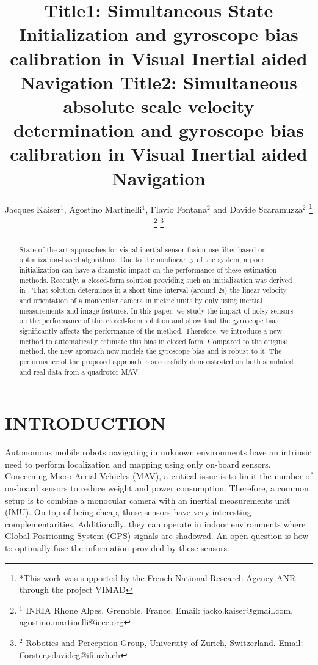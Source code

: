 \documentclass[letterpaper, 10 pt, conference]{ieeeconf}  %
\title{\LARGE \bf
Title1: Simultaneous State Initialization and gyroscope bias calibration in Visual Inertial aided Navigation
Title2: Simultaneous absolute scale velocity determination and gyroscope bias calibration in Visual Inertial aided Navigation
}
\author{Jacques Kaiser$^{1}$, Agostino Martinelli$^{1}$, Flavio Fontana$^{2}$ and Davide Scaramuzza$^{2}$%
 \thanks{*This work was supported by the French National Research
Agency ANR through the project VIMAD}%
 \thanks{$^{1}$ INRIA Rhone Alpes, Grenoble, France. Email: jacko.kaiser@gmail.com, agostino.martinelli@ieee.org}%
 \thanks{$^{2}$ Robotics and Perception Group, University of Zurich, Switzerland. Email: fforster,sdavideg@ifi.uzh.ch}%
}
\begin{document}
\maketitle
\thispagestyle{empty}
\pagestyle{empty}



\begin{abstract}
State of the art approaches for visual-inertial sensor fusion use filter-based or optimization-based algorithms. Due to the nonlinearity of the system, a poor initialization can have a dramatic impact on the performance of these estimation methods.
Recently, a closed-form solution providing such an initialization was derived in \cite{Martinelli2014}.
That solution determines in a short time interval (around 2s) the linear velocity and orientation of a monocular camera in metric units by only using inertial measurements and image features.
In this paper, we study the impact of noisy sensors on the performance of this closed-form solution and show that the gyroscope bias significantly affects the performance of the method.
Therefore, we introduce a new method to automatically estimate this bias in closed form.
Compared to the original method, the new approach now models the gyroscope bias and is robust to it.
The performance of the proposed approach is successfully demonstrated on both simulated and real data from a quadrotor MAV.
\end{abstract}



\section{INTRODUCTION}




Autonomous mobile robots navigating in unknown environments have an intrinsic need to perform localization and mapping using only on-board sensors.
Concerning Micro Aerial Vehicles (MAV), a critical issue is to limit the number of on-board sensors to reduce weight and power consumption.
Therefore, a common setup is to combine a monocular camera with an inertial measurements unit (IMU).
On top of being cheap, these sensors have very interesting complementarities.
Additionally, they can operate in indoor environments where Global Positioning System (GPS) signals are shadowed.
An open question is how to optimally fuse the information provided by these sensors.
\end{document}
